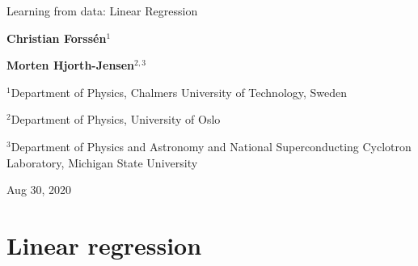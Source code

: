 \documentclass[%
oneside,                 %
final,                   %
10pt]{article}
\begin{document}

\newcommand{\exercisesection}[1]{\subsection*{#1}}







\thispagestyle{empty}

\begin{center}
{\LARGE\bf
\begin{spacing}{1.25}
Learning from data: Linear Regression
\end{spacing}
}
\end{center}


\begin{center}
{\bf Christian Forssén${}^{1}$} \\ [0mm]
\end{center}


\begin{center}
{\bf Morten Hjorth-Jensen${}^{2, 3}$} \\ [0mm]
\end{center}

\begin{center}
\centerline{{\small ${}^1$Department of Physics, Chalmers University of Technology, Sweden}}
\centerline{{\small ${}^2$Department of Physics, University of Oslo}}
\centerline{{\small ${}^3$Department of Physics and Astronomy and National Superconducting Cyclotron Laboratory, Michigan State University}}
\end{center}
    

\begin{center}
Aug 30, 2020
\end{center}

\vspace{1cm}


\section{Linear regression}
\end{document}
